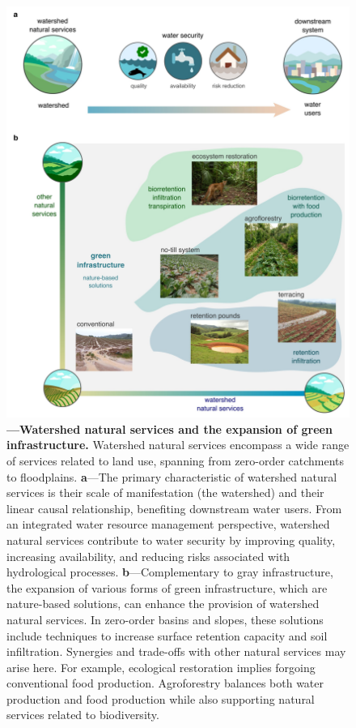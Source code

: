 \documentclass[./main_en.tex]{subfiles}
\begin{document}
\begin{figure}[t!] 
\centering				
\includegraphics[width=0.98\linewidth]{figs/fig_sbn_en.jpg}		
\caption[Watershed natural services and the expansion of green infrastructure.]
{\textbf{---\;Watershed natural services and the expansion of green infrastructure.}
    Watershed natural services encompass a wide range of services related to land use, spanning from zero-order catchments to floodplains.
    \;\textbf{a}\;---\;The primary characteristic of watershed natural services is their scale of manifestation (the watershed) and their linear causal relationship, benefiting downstream water users. From an integrated water resource management perspective, watershed natural services contribute to water security by improving quality, increasing availability, and reducing risks associated with hydrological processes.
    \;\textbf{b}\;---\;Complementary to gray infrastructure, the expansion of various forms of green infrastructure, which are nature-based solutions, can enhance the provision of watershed natural services. In zero-order basins and slopes, these solutions include techniques to increase surface retention capacity and soil infiltration. Synergies and trade-offs with other natural services may arise here. For example, ecological restoration implies forgoing conventional food production. Agroforestry balances both water production and food production while also supporting natural services related to biodiversity.
}
\label{fig:eco:watersheds} 		
\end{figure}
\end{document}
